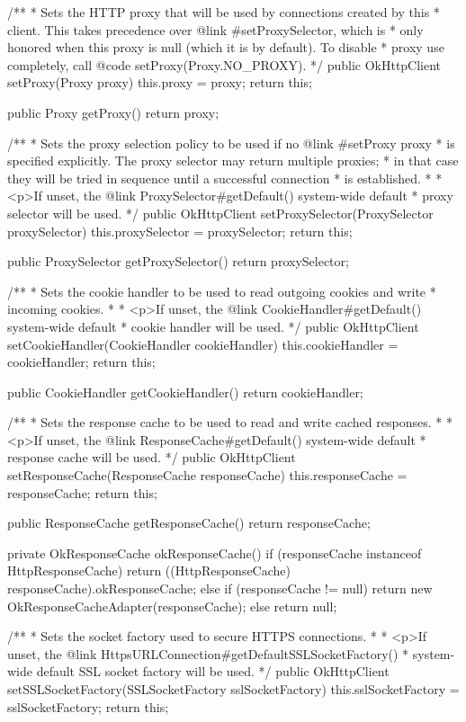 \begin{prompt}
{  /**
   * Sets the HTTP proxy that will be used by connections created by this
   * client. This takes precedence over {@link #setProxySelector}, which is
   * only honored when this proxy is null (which it is by default). To disable
   * proxy use completely, call {@code setProxy(Proxy.NO_PROXY)}.
   */
  public OkHttpClient setProxy(Proxy proxy) {
    this.proxy = proxy;
    return this;
  }

  public Proxy getProxy() {
    return proxy;
  }

  /**
   * Sets the proxy selection policy to be used if no {@link #setProxy proxy}
   * is specified explicitly. The proxy selector may return multiple proxies;
   * in that case they will be tried in sequence until a successful connection
   * is established.
   *
   * <p>If unset, the {@link ProxySelector#getDefault() system-wide default}
   * proxy selector will be used.
   */
  public OkHttpClient setProxySelector(ProxySelector proxySelector) {
    this.proxySelector = proxySelector;
    return this;
  }

  public ProxySelector getProxySelector() {
    return proxySelector;
  }

  /**
   * Sets the cookie handler to be used to read outgoing cookies and write
   * incoming cookies.
   *
   * <p>If unset, the {@link CookieHandler#getDefault() system-wide default}
   * cookie handler will be used.
   */
  public OkHttpClient setCookieHandler(CookieHandler cookieHandler) {
    this.cookieHandler = cookieHandler;
    return this;
  }

  public CookieHandler getCookieHandler() {
    return cookieHandler;
  }

  /**
   * Sets the response cache to be used to read and write cached responses.
   *
   * <p>If unset, the {@link ResponseCache#getDefault() system-wide default}
   * response cache will be used.
   */
  public OkHttpClient setResponseCache(ResponseCache responseCache) {
    this.responseCache = responseCache;
    return this;
  }

  public ResponseCache getResponseCache() {
    return responseCache;
  }

  private OkResponseCache okResponseCache() {
    if (responseCache instanceof HttpResponseCache) {
      return ((HttpResponseCache) responseCache).okResponseCache;
    } else if (responseCache != null) {
      return new OkResponseCacheAdapter(responseCache);
    } else {
      return null;
    }
  }

  /**
   * Sets the socket factory used to secure HTTPS connections.
   *
   * <p>If unset, the {@link HttpsURLConnection#getDefaultSSLSocketFactory()
   * system-wide default} SSL socket factory will be used.
   */
  public OkHttpClient setSSLSocketFactory(SSLSocketFactory sslSocketFactory) {
    this.sslSocketFactory = sslSocketFactory;
    return this;
  }

}
\end{prompt}

